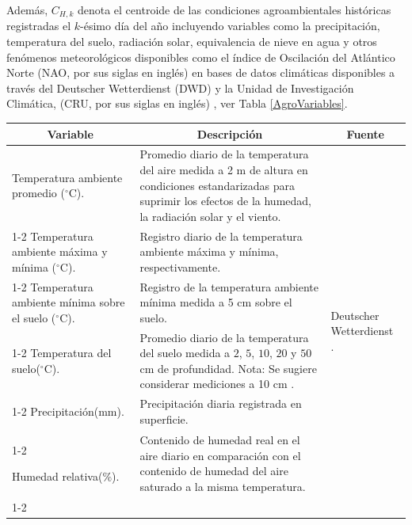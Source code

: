 Además, $C_{H,k}$ denota el centroide de las condiciones agroambientales históricas registradas el $k$-ésimo día del año incluyendo variables como la precipitación, temperatura del suelo, radiación solar, equivalencia de nieve en agua y otros fenómenos meteorológicos disponibles como el índice de Oscilación del Atlántico Norte (NAO, por sus siglas en inglés) en bases de datos climáticas disponibles a través del Deutscher Wetterdienst (DWD) \cite{DWD_2026} y la Unidad de Investigación Climática, (CRU, por sus siglas en inglés) \cite{Jones_1997}, ver Tabla \ref{AgroVariables}.\\

\begin{table}
	\centering
	\renewcommand{\arraystretch}{1.2}
	\begin{tabular}{p{4.4cm}|p{6.8cm}|p{4.2cm}}
		\hline
		\multicolumn{1}{c|}{\textbf{Variable}} & \multicolumn{1}{c|}{\textbf{Descripción}} & \multicolumn{1}{c}{\textbf{Fuente}} \\
		\hline
		Temperatura ambiente promedio \newline ($^\circ$C). &  Promedio diario de la temperatura del aire medida a 2 m de altura en condiciones estandarizadas para suprimir los efectos de la humedad, la radiación solar y el viento. &
		 \multirow{7}{*}{\parbox{4.5cm}{Deutscher Wetterdienst\\
		\cite{DWD_2026}.
		}} \\ \cline{1-2}
		Temperatura ambiente máxima y mínima \newline ($^\circ$C). &  Registro diario de la temperatura ambiente máxima y mínima, respectivamente. &
		\\ \cline{1-2}
		Temperatura ambiente mínima sobre el suelo \newline ($^\circ$C). &  Registro de la temperatura ambiente mínima medida a 5 cm sobre el suelo. &
		\\ \cline{1-2}
		Temperatura del suelo\newline ($^\circ$C).
		& Promedio diario de la temperatura del suelo medida a $2$, $5$, $10$, $20$ y $50$ cm de profundidad. \newline
		Nota: Se sugiere considerar mediciones a 10 cm \cite{Vatca_2021}. 
		& \\ \cline{1-2}
		Precipitación\newline (mm). 
		& Precipitación diaria registrada en superficie. 
		& \\ \cline{1-2}
		
		Humedad relativa\newline ($\%$). 
		& Contenido de humedad real en el aire diario en comparación con el contenido de humedad del aire saturado a la misma temperatura. 
		& \\ \cline{1-2}
		

\end{tabular}
\end{table}
